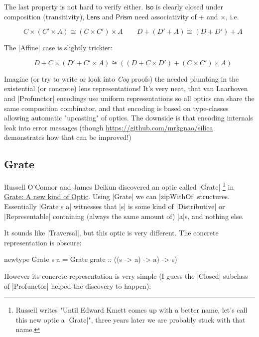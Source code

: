\documentclass{article}
\begin{document}
The last property is not hard to verify either. $\mathsf{Iso}$ is clearly
closed under composition (transitivity), $\mathsf{Lens}$ and $\mathsf{Prism}$
need associativity of $+$ and $\times$, i.e.

\begin{equation}
  \quad C \times (C' \times A) \cong (C \times C') \times A
  \qquad D + (D' + A) \cong (D + D') + A
\end{equation}

The |Affine| case is slightly trickier:

\begin{equation}
  \quad D + C \times (D' + C' \times A) \cong ((D + C \times D')+ (C \times C') \times A)
\end{equation}

Imagine (or try to write or look into \emph{Coq} proofs) the needed plumbing in the
existential (or concrete) lens representations! It's very neat, that
van Laarhoven and |Profunctor| encodings use uniform representations so
all optics can share the same composition combinator, and that encoding is
based on type-classes allowing automatic "upcasting" of optics.
The downside is that encoding internals leak into error messages (though
\url{https://github.com/mrkgnao/silica} demonstrates how that can be improved!)

\subsection{Grate}

Russell O'Connor and James Deikun discovered an optic called |Grate|
\footnote{Russell writes "Until Edward Kmett comes up with a better name, let's call this new optic a |Grate|",
three years later we are probably stuck with that name.}
in \href{https://r6research.livejournal.com/28050.html}{Grate: A new kind of
Optic}.  Using |Grate| we can |zipWithOf| structures. Essentially |Grate s a|
witnesses that |s| is some kind of |Distributive| or |Representable| containing
(always the same amount of) |a|s, and nothing else.

It sounds like |Traversal|, but this optic is very different.
The concrete representation is obscure:

\begin{code}
newtype Grate s a = Grate { grate :: ((s -> a) -> a) -> s) }
\end{code}

However its concrete representation is very simple
(I guess the |Closed| subclass of |Profunctor| helped the discovery to happen):
\end{document}

